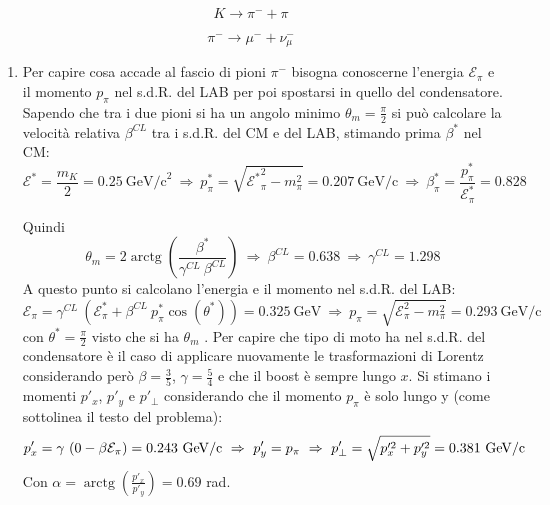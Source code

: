 \documentclass[12pt,twoside,a4]{article}
\DeclareMathOperator{\arctg}{arctg}
\begin{document}
\begin{solution}
\begin{equation} \label{eq: dec5.1.1}
     K \rightarrow \pi^- + \pi
 \end{equation}
 

 \begin{equation}
  \label{eq: dec5.1.2}
     \pi^- \rightarrow \mu^- + \nu^-_\mu
 \end{equation}
 
 \begin{enumerate}[label=(\textit{\roman*})]
 	\item Per capire cosa accade al fascio di pioni $\pi^-$ bisogna conoscerne l'energia $\mathcal{E}_\pi$ e il momento $p_\pi$ nel s.d.R. del LAB per poi spostarsi in quello del condensatore. Sapendo che tra i due pioni si ha un angolo minimo $\theta_m = \frac{\pi}{2}$ si può calcolare la velocità relativa $\beta^{CL}$ tra i s.d.R. del CM e del LAB, stimando prima $\beta^\ast$ nel CM: 
\begin{equation*}
    \mathcal{E}^\ast = \frac{m_K}{2} = 0.25 \ \mathrm{GeV/c}^2 \ \Rightarrow \ p^\ast_\pi = \sqrt{\mathcal{E^\ast}^2_\pi - m^2_\pi} = 0.207 \ \mathrm{GeV/c} \ \Rightarrow \ \beta^\ast_\pi = \frac{p^\ast_\pi}{\mathcal{E}^\ast_\pi} = 0.828  
\end{equation*}

Quindi \begin{equation*}
     \theta_m = 2 \arctg{\left(\frac{\beta^\ast}{\gamma^{CL} \ \beta^{CL}} \right)}  \  \Rightarrow  \  \beta^{CL} = 0.638  \  \Rightarrow  \  \gamma^{CL} = 1.298 
 \end{equation*}
 A questo punto si calcolano l'energia e il momento nel s.d.R. del LAB: \begin{equation*}
     \mathcal{E}_\pi = \gamma^{CL} \ (\mathcal{E}^\ast_\pi + \beta^{CL} \ p^\ast_\pi \cos{(\theta^\ast)}) =0.325 \ \mathrm{GeV}   \  \Rightarrow  \  p_\pi = \sqrt{\mathcal{E}^2_\pi - m^2_\pi} = 0.293 \ \mathrm{GeV/c}  
 \end{equation*} 
 con $\theta^\ast = \frac{\pi}{2}$ visto che si ha $\theta_m$ . Per capire che tipo di moto ha nel s.d.R. del condensatore è il caso di applicare nuovamente le trasformazioni di Lorentz considerando però $\beta = \frac{3}{5}$, $\gamma = \frac{5}{4}$ e che il boost è sempre lungo $x$. Si stimano i momenti $p'_x$, $p'_y$ e $p'_\bot$ considerando che il momento $p_\pi$ è solo lungo y (come sottolinea il testo del problema): 
 \begin{equation*}
     p'_x = \gamma \ (0- \beta \\\mathcal{E}_\pi ) = 0.243 \ \mathrm{GeV/c}   \  \Rightarrow  \  p'_y = p_\pi  \  \Rightarrow  \  p'_\bot = \sqrt{p'^2_x + p'^2_y} = 0.381 \ \mathrm{GeV/c} 
 \end{equation*}
 Con $\alpha = \arctg{\left( \frac{p'_x}{p'_y}\right) = 0.69}$ rad. 
 

\end{enumerate}
\end{solution}
\end{document}
